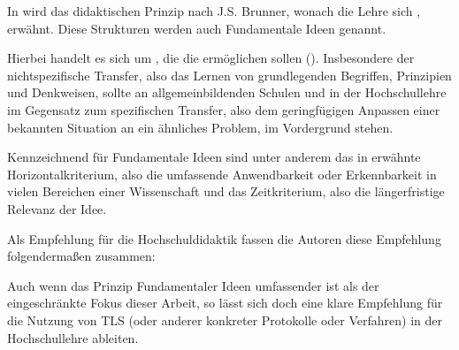 In \cite{schubert11} wird das didaktischen Prinzip nach J.S. Brunner, wonach die Lehre sich , erwähnt. Diese Strukturen werden auch Fundamentale Ideen genannt.

Hierbei handelt es sich um , die die  ermöglichen sollen (\cite{schubert11}). Insbesondere der nichtspezifische Transfer, also das Lernen von grundlegenden Begriffen, Prinzipien und Denkweisen, sollte an allgemeinbildenden Schulen und in der Hochschullehre im Gegensatz zum spezifischen Transfer, also dem geringfügigen Anpassen einer bekannten Situation an ein ähnliches Problem, im Vordergrund stehen.

Kennzeichnend für Fundamentale Ideen sind unter anderem das in \cite{schubert11} erwähnte Horizontalkriterium, also die umfassende Anwendbarkeit oder Erkennbarkeit in vielen Bereichen einer Wissenschaft und das Zeitkriterium, also die längerfristige Relevanz der Idee. 

Als Empfehlung für die Hochschuldidaktik fassen die Autoren diese Empfehlung folgendermaßen zusammen:\\
\begin{quote}
 \cite{schubert11}
\end{quote}

Auch wenn das Prinzip Fundamentaler Ideen umfassender ist als der eingeschränkte Fokus dieser Arbeit, so lässt sich doch eine klare Empfehlung für die Nutzung von TLS (oder anderer konkreter Protokolle oder Verfahren) in der Hochschullehre ableiten. 

